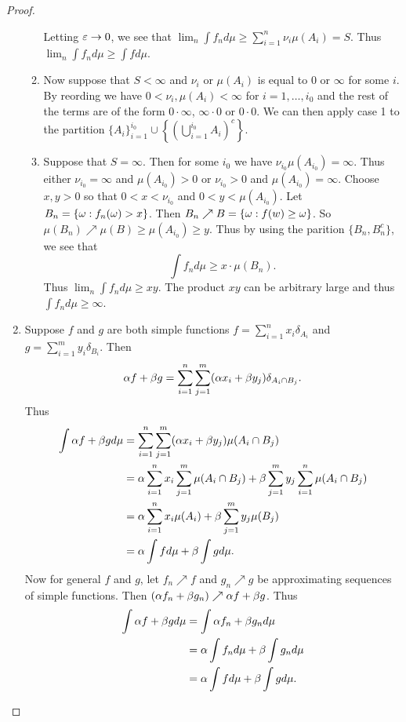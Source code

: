 \begin{proof}
\begin{enumerate}
\begin{enumerate}
            Letting $\varepsilon \to 0$, we see that $\lim_n \int f_n d\mu \ge \sum_{i=1}^n \nu_i\mu(A_i)=S$. Thus $\lim_n \int f_n d\mu \ge \int f d\mu$.
            \item Now suppose that $S<\infty$ and $\nu_i$ or $\mu(A_i)$ is equal to 0 or $\infty$ for some $i$. By reording we have $0< \nu_i, \mu(A_i) < \infty$ for $i = 1,\ldots,i_0$ and the rest of the terms are of the form $0\cdot \infty$, $\infty \cdot 0$ or $0\cdot 0$. We can then apply case 1 to the partition $\{A_i\}_{i=1}^{i_0} \cup \left\{\left(\bigcup_{i=1}^{i_0} A_i\right)^c\right\}$.
            \item Suppose that $S=\infty$. Then for some $i_0$ we have $\nu_{i_0}\mu(A_{i_0}) = \infty$. Thus either $\nu_{i_0} = \infty$ and $\mu(A_{i_0})>0$ or $\nu_{i_0} > 0$ and $\mu(A_{i_0}) = \infty$. Choose $x,y >0$ so that $0 < x< \nu_{i_0}$ and $0 < y < \mu(A_{i_0})$. Let $B_n= \{{\omega}: f_n({\omega}) >x\}$. Then $B_n \nearrow B = \{{\omega}: f(w)\ge {\omega}\}$. So $\mu(B_n) \nearrow \mu(B) \ge \mu(A_{i_0}) \ge y$. Thus by using the parition $\{B_n,B_n^c\}$, we see that 
            \[\int f_n d\mu \ge x\cdot \mu(B_n). \]
            Thus $\lim_n \int f_n d\mu \ge xy$. The product $xy$ can be arbitrary large and thus $\int f_n d\mu \ge \infty$.
        \end{enumerate}
        \item Suppose $f$ and $g$ are both simple functions $f = \sum_{i=1}^n x_i \delta_{A_i}$ and $g = \sum_{i=1}^m y_i \delta_{B_i}$. Then
        \[{\alpha} f + \beta g = \sum_{i=1}^n \sum_{j=1}^m ({\alpha} x_i + \beta y_j) \delta_{A_i \cap B_j}. \]
        Thus
        \begin{align*}
            \int {\alpha} f + \beta g d\mu &= \sum_{i=1}^n \sum_{j=1}^m ({\alpha} x_i + \beta y_j) \mu(A_i \cap B_j)\\
        &= {\alpha} \sum_{i=1}^n x_i \sum_{j=1}^m \mu(A_i \cap B_j) + \beta \sum_{j=1}^m y_j \sum_{i=1}^n \mu(A_i \cap B_j)\\
        &= {\alpha} \sum_{i=1}^n x_i \mu(A_i) + \beta \sum_{j=1}^m y_j \mu(B_j)\\
        &= {\alpha} \int f d\mu + \beta \int g d\mu.
        \end{align*}
        Now for general $f$ and $g$, let $f_n \nearrow f$ and $g_n \nearrow g$ be approximating sequences of simple functions. Then $({\alpha} f_n + \beta g_n) \nearrow {\alpha} f + \beta g$. Thus 
        \begin{align*}
            \int {\alpha} f+\beta g d \mu &= \int {\alpha} f_n + \beta g_n d \mu \\
            &= {\alpha} \int f_n d \mu + \beta \int g_n d \mu \\
            &= {\alpha}\int fd \mu + \beta\int g d \mu. \qedhere
        \end{align*}
    \end{enumerate}
\end{proof}
